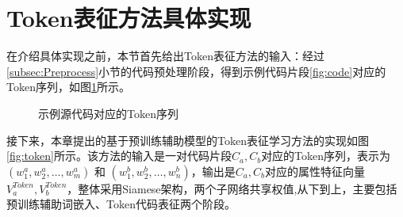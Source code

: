 \section{Token表征方法具体实现}
\label{sec:Tokenachieve}
在介绍具体实现之前，本节首先给出Token表征方法的输入：经过\ref{subsec:Preprocess}小节的代码预处理阶段，得到示例代码片段\ref{fig:code}对应的Token序列，如图\ref{fig:tokencode}所示。
\begin{figure}[H] 
  \centering  %
  \caption{示例源代码对应的Token序列}    %
  \label{fig:tokencode}    %
\end{figure}

接下来，本章提出的基于预训练辅助模型的Token表征学习方法的实现如图\ref{fig:token}所示。该方法的输入是一对代码片段$C_{a},C_{b}$对应的Token序列，表示为$\left( w_{1}^{a},w_{2}^{a},\ldots,w_{m}^{a}\right)$ 和 $\left( w_{1}^{b},w_{2}^{b},\ldots,w_{n}^{b} \right)$，输出是$C_{a},C_{b}$对应的属性特征向量 $V_{a}^{Token},V_{b}^{Token}$，整体采用Siamese架构，两个子网络共享权值,从下到上，主要包括预训练辅助词嵌入、Token代码表征两个阶段。

